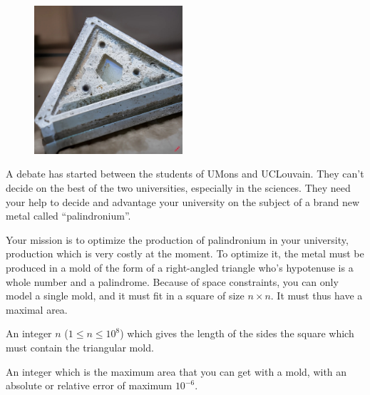 \problemname{\problemyamlname}

\begin{figure}
    \centering
    \includegraphics[width=5.5cm]{palindromium.jpg}
\end{figure}

A debate has started between the students of UMons and UCLouvain.
They can't decide on the best of the two universities, especially in the sciences.
They need your help to decide and advantage your university on the subject of a brand new metal called ``palindronium''.

Your mission is to optimize the production of palindronium in your university, production which is very costly at the moment.
To optimize it, the metal must be produced in a mold of the form of a right-angled triangle who's hypotenuse is a whole number and a palindrome.
Because of space constraints, you can only model a single mold, and it must fit in a square of size $n \times n$.
It must thus have a maximal area.

\begin{figure}[h]
\centering
{}
\end{figure}

\begin{Input}
	An integer $n$ ($1 \le n \le 10^8$) which gives the length of the sides the square which must contain the triangular mold.
\end{Input}

\begin{Output}
	An integer which is the maximum area that you can get with a mold, with an absolute or relative error of maximum $10^{-6}$.
\end{Output}
